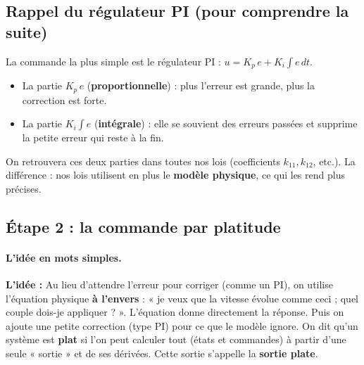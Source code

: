 \documentclass[11pt,a4paper]{article}
\newcommand{\Idee}{\textbf{L'idée : }}
\begin{document}
\subsection{Rappel du régulateur PI (pour comprendre la suite)}
La commande la plus simple est le régulateur PI : $u = K_p\, e + K_i\int e\,dt$.
\begin{itemize}
\item La partie $K_p\,e$ (\textbf{proportionnelle}) : plus l'erreur est grande, plus la correction est forte.
\item La partie $K_i\int e$ (\textbf{intégrale}) : elle se souvient des erreurs passées et supprime la
petite erreur qui reste à la fin.
\end{itemize}
On retrouvera ces deux parties dans toutes nos lois (coefficients $k_{11}, k_{12}$, etc.). La différence :
nos lois utilisent en plus le \textbf{modèle physique}, ce qui les rend plus précises.

\subsection{Étape 2 : la commande par platitude}

\paragraph{L'idée en mots simples.}
\begin{idee}
\Idee
Au lieu d'attendre l'erreur pour corriger (comme un PI), on utilise l'équation physique
\textbf{à l'envers} : « je veux que la vitesse évolue comme ceci ; quel couple dois-je appliquer ? ».
L'équation donne directement la réponse. Puis on ajoute une petite correction (type PI) pour ce que le
modèle ignore.
On dit qu'un système est \textbf{plat} si l'on peut calculer tout (états et commandes) à partir d'une seule
« sortie » et de ses dérivées. Cette sortie s'appelle la \textbf{sortie plate}.
\end{idee}
\end{document}
